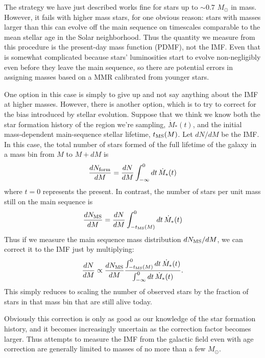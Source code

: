 The strategy we have just described works fine for stars up to $\sim 0.7$ $M_\odot$ in mass. However, it fails with higher mass stars, for one obvious reason: stars with masses larger than this can evolve off the main sequence on timescales comparable to the mean stellar age in the Solar neighborhood. Thus the quantity we measure from this procedure is the present-day mass function (PDMF), not the IMF. Even that is somewhat complicated because stars' luminosities start to evolve non-negligibly even before they leave the main sequence, so there are potential errors in assigning masses based on a MMR calibrated from younger stars.

One option in this case is simply to give up and not say anything about the IMF at higher masses. However, there is another option, which is to try to correct for the bias introduced by stellar evolution. Suppose that we think we know both the star formation history of the region we're sampling, $\dot{M}_*(t)$, and the initial mass-dependent main-sequence stellar lifetime, $t_{\rm MS}(M)$. Let $dN/dM$ be the IMF. In this case, the total number of stars formed of the full lifetime of the galaxy in a mass bin from $M$ to $M+dM$ is
\begin{equation}
\frac{dN_{\rm form}}{dM} =  \frac{dN}{dM} \int_{-\infty}^0 dt \, \dot{M}_*(t)
\end{equation}
where $t=0$ represents the present. In contrast, the number of stars per unit mass still on the main sequence is
\begin{equation}
\frac{dN_{\rm MS}}{dM} = \frac{dN}{dM} \int_{-t_{\rm MS}(M)}^0 dt \, \dot{M}_*(t)
\end{equation}
Thus if we measure the main sequence mass distribution $dN_{\rm MS}/dM$, we can correct it to the IMF just by multiplying:
\begin{equation}
\frac{dN}{dM} \propto \frac{dN_{\rm MS}}{dM} \frac{\int_{-t_{\rm MS}(M)}^0 dt \, \dot{M}_*(t)}{\int_{-\infty}^0 dt \, \dot{M}_*(t)}.
\end{equation}
This simply reduces to scaling the number of observed stars by the fraction of stars in that mass bin that are still alive today.

Obviously this correction is only as good as our knowledge of the star formation history, and it becomes increasingly uncertain as the correction factor becomes larger. Thus attempts to measure the IMF from the galactic field even with age correction are generally limited to masses of no more than a few $M_\odot$.
